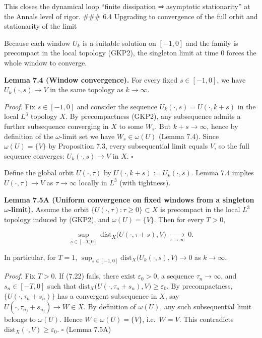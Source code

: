 \documentclass[
  11pt,
]{article}
\begin{document}
This closes the dynamical loop ``finite dissipation ⇒ asymptotic stationarity'' at the Annals level of rigor. \#\#\# 6.4 Upgrading to convergence of the full orbit and stationarity of the limit

Because each window \(U_k\) is a suitable solution on \([-1,0]\) and the family is precompact in the local topology (GKP2), the singleton limit at time \(0\) forces the whole window to converge.

\textbf{Lemma 7.4 (Window convergence).} For every fixed \(s\in[-1,0]\), we have \(U_k(\cdot,s)\to V\) in the same topology as \(k\to\infty\).

\emph{Proof.} Fix \(s\in[-1,0]\) and consider the sequence \(U_k(\cdot,s)=U(\cdot,k+s)\) in the local \(L^3\) topology \(X\). By precompactness (GKP2), any subsequence admits a further subsequence converging in \(X\) to some \(W_s\). But \(k+s\to\infty\), hence by definition of the \(\omega\)-limit set we have \(W_s\in\omega(U)\) (Lemma 7.4). Since \(\omega(U)=\{V\}\) by Proposition 7.3, every subsequential limit equals \(V\), so the full sequence converges: \(U_k(\cdot,s)\to V\) in \(X\). \(\square\)

Define the global orbit \(U(\cdot,\tau)\) by \(U(\cdot,k+s):=U_k(\cdot,s)\). Lemma 7.4 implies \(U(\cdot,\tau)\to V\) as \(\tau\to\infty\) locally in \(L^3\) (with tightness).

\textbf{Lemma 7.5A (Uniform convergence on fixed windows from a singleton \(\omega\)-limit).} Assume the orbit \(\{U(\cdot,\tau):\tau\ge 0\}\subset X\) is precompact in the local \(L^3\) topology induced by (GKP2), and \(\omega(U)=\{V\}\). Then for every \(T>0\),

\begin{equation}
\sup_{s\in[-T,0]}\ \mathrm{dist}_X\big(U(\cdot,\tau+s),V\big)\ \xrightarrow[\tau\to\infty]{}\ 0.
\tag{7.22}
\end{equation}

In particular, for \(T=1\), \(\sup_{s\in[-1,0]}\mathrm{dist}_X\big(U_k(\cdot,s),V\big)\to 0\) as \(k\to\infty\).

\emph{Proof.} Fix \(T>0\). If (7.22) fails, there exist \(\varepsilon_0>0\), a sequence \(\tau_n\to\infty\), and \(s_n\in[-T,0]\) such that \(\mathrm{dist}_X\big(U(\cdot,\tau_n+s_n),V\big)\ge \varepsilon_0\). By precompactness, \(\{U(\cdot,\tau_n+s_n)\}\) has a convergent subsequence in \(X\), say \(U(\cdot,\tau_{n_j}+s_{n_j})\to W\in X\). By definition of \(\omega(U)\), any such subsequential limit belongs to \(\omega(U)\). Hence \(W\in\omega(U)=\{V\}\), i.e.~\(W=V\). This contradicts \(\mathrm{dist}_X(\cdot,V)\ge\varepsilon_0\). \(\square\) (Lemma 7.5A)
\end{document}
